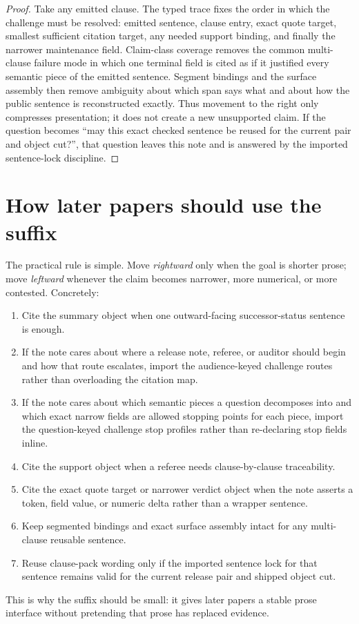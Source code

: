 \documentclass[11pt]{article}
\begin{document}
\begin{proof}
Take any emitted clause.
The typed trace fixes the order in which the challenge must be resolved: emitted sentence, clause entry, exact quote target, smallest sufficient citation target, any needed support binding, and finally the narrower maintenance field.
Claim-class coverage removes the common multi-clause failure mode in which one terminal field is cited as if it justified every semantic piece of the emitted sentence.
Segment bindings and the surface assembly then remove ambiguity about which span says what and about how the public sentence is reconstructed exactly.
Thus movement to the right only compresses presentation; it does not create a new unsupported claim.
If the question becomes ``may this exact checked sentence be reused for the current pair and object cut?'', that question leaves this note and is answered by the imported sentence-lock discipline.\cite{series:sentencelocks}
\end{proof}

\section{How later papers should use the suffix}
The practical rule is simple.
Move \emph{rightward} only when the goal is shorter prose; move \emph{leftward} whenever the claim becomes narrower, more numerical, or more contested.
Concretely:
\begin{enumerate}[leftmargin=*]
\item Cite the summary object when one outward-facing successor-status sentence is enough.
\item If the note cares about where a release note, referee, or auditor should begin and how that route escalates, import the audience-keyed challenge routes rather than overloading the citation map.\cite{series:challengeroutes}
\item If the note cares about which semantic pieces a question decomposes into and which exact narrow fields are allowed stopping points for each piece, import the question-keyed challenge stop profiles rather than re-declaring stop fields inline.\cite{series:challengestops}
\item Cite the support object when a referee needs clause-by-clause traceability.
\item Cite the exact quote target or narrower verdict object when the note asserts a token, field value, or numeric delta rather than a wrapper sentence.
\item Keep segmented bindings and exact surface assembly intact for any multi-clause reusable sentence.
\item Reuse clause-pack wording only if the imported sentence lock for that sentence remains valid for the current release pair and shipped object cut.\cite{series:sentencelocks}
\end{enumerate}
This is why the suffix should be small: it gives later papers a stable prose interface without pretending that prose has replaced evidence.
\end{document}
